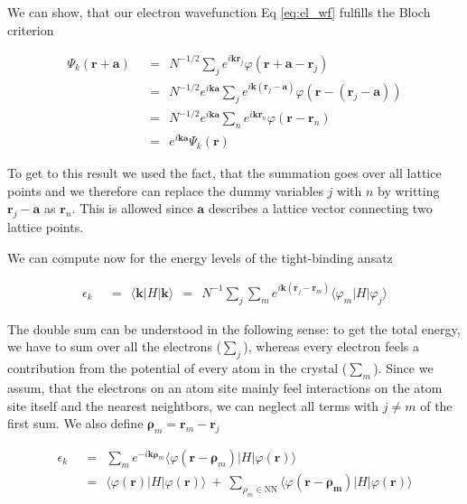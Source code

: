 \documentclass[10pt]{report}
\numberwithin{equation}{chapter}
\newcommand{\refEq}[1]{
  Eq  \ref{#1}
}
\begin{document}
We can show, that our electron wavefunction \refEq{eq:el_wf} fulfills the Bloch criterion


\begin{align}
  \Psi_k(\mathbf{r} + \mathbf{a}) 
  ~~& =~~ N^{-1/2} \sum_j e^{i \mathbf{k} \mathbf{r}_j} \varphi(\mathbf{r} + \mathbf{a} - \mathbf{r}_j) \nonumber \\
  ~~& =~~ N^{-1/2} e^{i\mathbf{k} \mathbf{a}} 
  \sum_j e^{i\mathbf{k} (\mathbf{r}_j - \mathbf{a})} \varphi(\mathbf{r} - (\mathbf{r}_j-\mathbf{a})) \nonumber \\
  ~~& =~~ N^{-1/2} e^{i\mathbf{k} \mathbf{a}}
  \sum_n e^{i\mathbf{k} \mathbf{r}_n} \varphi(\mathbf{r} - \mathbf{r}_n) \nonumber \\
  ~~& =~~ e^{i\mathbf{k} \mathbf{a}} \Psi_k(\mathbf{r})
\end{align}

To get to this result we used the fact, that the summation goes over all lattice points and we therefore can replace the dummy variables $j$ with $n$ by writting $\mathbf{r}_j - \mathbf{a}$ as $\mathbf{r}_n$. This is allowed since $\mathbf{a}$ describes a lattice vector connecting two lattice points.

We can compute now for the energy levels of the tight-binding ansatz

\begin{align}
  \epsilon_k ~~& =~~ \langle \mathbf{k} | H | \mathbf{k} \rangle ~~=~~
  N^{-1} \sum_j \sum_m e^{i\mathbf{k} (\mathbf{r}_j - \mathbf{r}_m)} 
  \langle \varphi_m | H | \varphi_j \rangle 
\end{align}

The double sum can be understood in the following sense: to get the total energy, we have to sum over all the electrons ($\sum_j$), whereas every electron feels a contribution from the potential of every atom in the crystal ($\sum_m$). Since we assum, that the electrons on an atom site mainly feel interactions on the atom site itself and the nearest neightbors, we can neglect all terms with $j \neq m$ of the first sum. We also define $\mathbf{\rho}_m = \mathbf{r}_m - \mathbf{r}_j$

\begin{align} \label{eq:tb_der}
  \epsilon_k ~~& =~~ \sum_m e^{-i\mathbf{k} \mathbf{\rho}_m} \langle \varphi(\mathbf{r}-\mathbf{\rho}_m) | H | \varphi(\mathbf{r}) \rangle \nonumber \\
  ~~& =~~ \langle \varphi(\mathbf{r}) |H| \varphi(\mathbf{r}) \rangle 
  ~+~ \sum_{\rho_m \in \text{NN}} \langle \varphi(\mathbf{r} - \mathbf{\rho_m}) |H| \varphi(\mathbf{r}) \rangle
\end{align}
\end{document}

